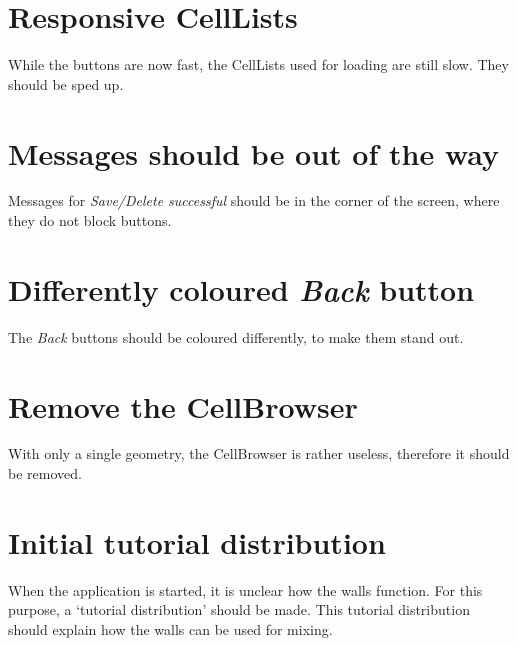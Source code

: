 \section*{Responsive CellLists}
While the buttons are now fast, the CellLists used for loading are still slow. They should be sped up.

\section*{Messages should be out of the way}
Messages for \emph{Save/Delete successful} should be in the corner of the screen, where they do not block buttons.

\section*{Differently coloured \emph{Back} button}
The \emph{Back} buttons should be coloured differently, to make them stand out.

\section*{Remove the CellBrowser}
With only a single geometry, the CellBrowser is rather useless, therefore it should be removed.

\section*{Initial tutorial distribution}
When the application is started, it is unclear how the walls function. For this purpose, a `tutorial distribution' should be made. This tutorial distribution should explain how the walls can be used for mixing.